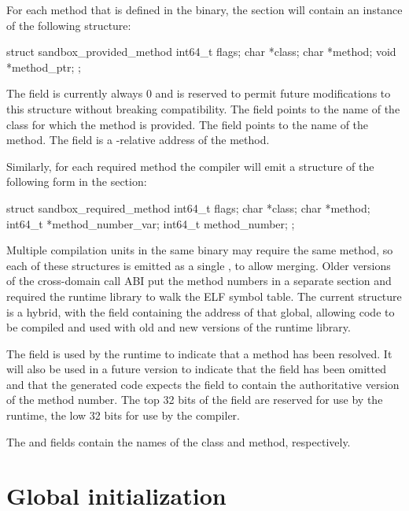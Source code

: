 For each method that is defined in the binary, the  section will contain an instance of the following structure:

\begin{csnippet}
struct sandbox_provided_method
{
	int64_t   flags;
	char     *class;
	char     *method;
	void     *method_ptr;
};
\end{csnippet}

The  field is currently always 0 and is reserved to permit future modifications to this structure without breaking compatibility.
The  field points to the name of the class for which the method is provided.
The  field points to the name of the method.
The  field is a -relative address of the method.

Similarly, for each required method the compiler will emit a structure of the following form in the  section:

\begin{csnippet}
struct sandbox_required_method
{
	int64_t   flags;
	char     *class;
	char     *method;
	int64_t  *method_number_var;
	int64_t   method_number;
};
\end{csnippet}

Multiple compilation units in the same binary may require the same method, so each of these structures is emitted as a single , to allow merging.
Older versions of the cross-domain call ABI put the method numbers in a separate section and required the runtime library to walk the ELF symbol table.
The current structure is a hybrid, with the  field containing the address of that global, allowing code to be compiled and used with old and new versions of the runtime library.

The  field is used by the runtime to indicate that a method has been resolved.
It will also be used in a future version to indicate that the  field has been omitted and that the generated code expects the  field to contain the authoritative version of the method number.
The top 32 bits of the  field are reserved for use by the runtime, the low 32 bits for use by the compiler.

The  and  fields contain the names of the class and method, respectively.

\section{Global initialization}

